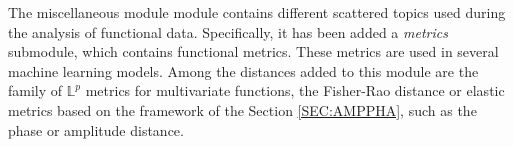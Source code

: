 

The miscellaneous module
module contains different scattered topics used during the analysis of
functional data. Specifically, it has been added a \textit{metrics} submodule, which
contains functional metrics.
These metrics are used in several machine learning models.
Among the distances added to this module are
the family of $\mathbb{L}^p$
metrics for multivariate functions, the Fisher-Rao distance or elastic metrics
based on the framework of the Section \ref{SEC:AMPPHA}, such as the phase or
amplitude distance.
